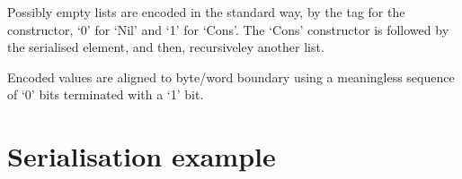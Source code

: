\documentclass[a4paper]{article}
\begin{document}
\begin{appendices}
Possibly empty lists are encoded in the standard way, by the tag for the constructor,
`0' for `Nil' and `1' for `Cons'. The `Cons' constructor is followed by the serialised
element, and then, recursiveley another list.

Encoded values are aligned to byte/word boundary using a meaningless sequence of `0' bits
terminated with a `1' bit.

\section{Serialisation example}

\end{appendices}


\end{document}
